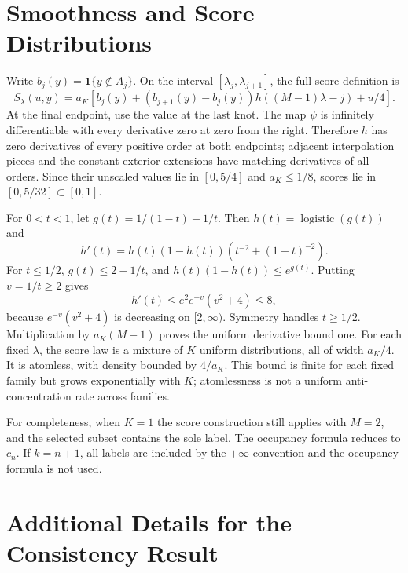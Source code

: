 \documentclass{article}
\newcommand{\ind}{\mathbf 1}
\begin{document}



\newpage
\appendix
\onecolumn
\section{Smoothness and Score Distributions}\label{app:smooth}

Write $b_j(y)=\ind\{y\notin A_j\}$. On the interval $[\lambda_j,\lambda_{j+1}]$, the full score definition is
\begin{equation}
 S_\lambda(u,y)=a_K\left[b_j(y)+(b_{j+1}(y)-b_j(y))h((M-1)\lambda-j)+u/4\right].
\end{equation}
At the final endpoint, use the value at the last knot. The map $\psi$ is infinitely differentiable with every derivative zero at zero from the right. Therefore $h$ has zero derivatives of every positive order at both endpoints; adjacent interpolation pieces and the constant exterior extensions have matching derivatives of all orders. Since their unscaled values lie in $[0,5/4]$ and $a_K\le1/8$, scores lie in $[0,5/32]\subset[0,1]$.

For $0<t<1$, let $g(t)=1/(1-t)-1/t$. Then $h(t)=\operatorname{logistic}(g(t))$ and
\begin{equation}
 h'(t)=h(t)(1-h(t))\left(t^{-2}+(1-t)^{-2}\right).
\end{equation}
For $t\le1/2$, $g(t)\le2-1/t$, and $h(t)(1-h(t))\le e^{g(t)}$. Putting $v=1/t\ge2$ gives
\begin{equation}
 h'(t)\le e^2 e^{-v}(v^2+4)\le8,
\end{equation}
because $e^{-v}(v^2+4)$ is decreasing on $[2,\infty)$. Symmetry handles $t\ge1/2$. Multiplication by $a_K(M-1)$ proves the uniform derivative bound one. For each fixed $\lambda$, the score law is a mixture of $K$ uniform distributions, all of width $a_K/4$. It is atomless, with density bounded by $4/a_K$. This bound is finite for each fixed family but grows exponentially with $K$; atomlessness is not a uniform anti-concentration rate across families.

For completeness, when $K=1$ the score construction still applies with $M=2$, and the selected subset contains the sole label. The occupancy formula reduces to $c_n$. If $k=n+1$, all labels are included by the $+\infty$ convention and the occupancy formula is not used.

\section{Additional Details for the Consistency Result}\label{app:consistency}
\end{document}
